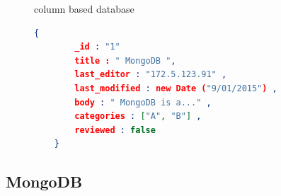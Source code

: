\begin{figure}[h]
	\centering
	\centering
	\caption{column based database~\cite{wuoverview}}
	\label{fig:nosql-db-two}
	
\end{figure}

	\begin{figure}[h]
	\begin{lstlisting}[language=JSON,basicstyle=\scriptsize]
	{
		_id : "1"
		title : " MongoDB ",
		last_editor : "172.5.123.91" ,
		last_modified : new Date ("9/01/2015") ,
		body : " MongoDB is a..." ,
		categories : ["A", "B"] ,
		reviewed : false
	}
	\end{lstlisting} 
	\caption{}
	\label{sample-mongodb-document}
\end{figure}

	\subsection{MongoDB}\label{nosql-mongodb}
	
